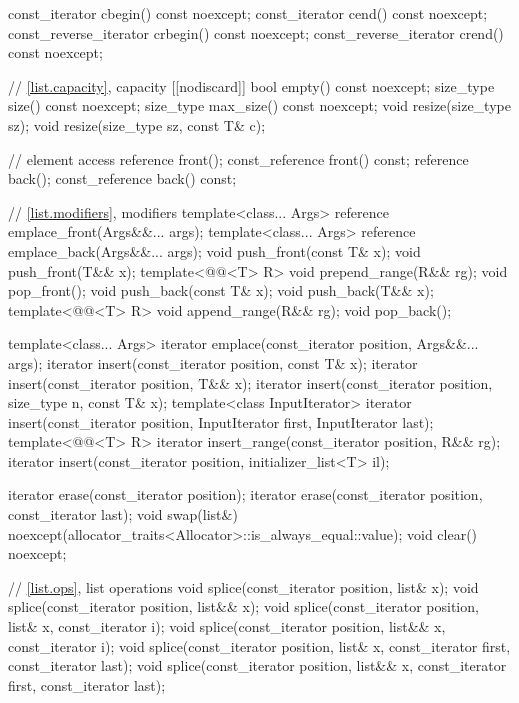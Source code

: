 \begin{codeblock}
{{    const_iterator         cbegin() const noexcept;
    const_iterator         cend() const noexcept;
    const_reverse_iterator crbegin() const noexcept;
    const_reverse_iterator crend() const noexcept;

    // \ref{list.capacity}, capacity
    [[nodiscard]] bool empty() const noexcept;
    size_type size() const noexcept;
    size_type max_size() const noexcept;
    void      resize(size_type sz);
    void      resize(size_type sz, const T& c);

    // element access
    reference       front();
    const_reference front() const;
    reference       back();
    const_reference back() const;

    // \ref{list.modifiers}, modifiers
    template<class... Args> reference emplace_front(Args&&... args);
    template<class... Args> reference emplace_back(Args&&... args);
    void push_front(const T& x);
    void push_front(T&& x);
    template<@@<T> R>
      void prepend_range(R&& rg);
    void pop_front();
    void push_back(const T& x);
    void push_back(T&& x);
    template<@@<T> R>
      void append_range(R&& rg);
    void pop_back();

    template<class... Args> iterator emplace(const_iterator position, Args&&... args);
    iterator insert(const_iterator position, const T& x);
    iterator insert(const_iterator position, T&& x);
    iterator insert(const_iterator position, size_type n, const T& x);
    template<class InputIterator>
      iterator insert(const_iterator position, InputIterator first, InputIterator last);
    template<@@<T> R>
      iterator insert_range(const_iterator position, R&& rg);
    iterator insert(const_iterator position, initializer_list<T> il);

    iterator erase(const_iterator position);
    iterator erase(const_iterator position, const_iterator last);
    void     swap(list&) noexcept(allocator_traits<Allocator>::is_always_equal::value);
    void     clear() noexcept;

    // \ref{list.ops}, list operations
    void splice(const_iterator position, list& x);
    void splice(const_iterator position, list&& x);
    void splice(const_iterator position, list& x, const_iterator i);
    void splice(const_iterator position, list&& x, const_iterator i);
    void splice(const_iterator position, list& x, const_iterator first, const_iterator last);
    void splice(const_iterator position, list&& x, const_iterator first, const_iterator last);

}}
\end{codeblock}
